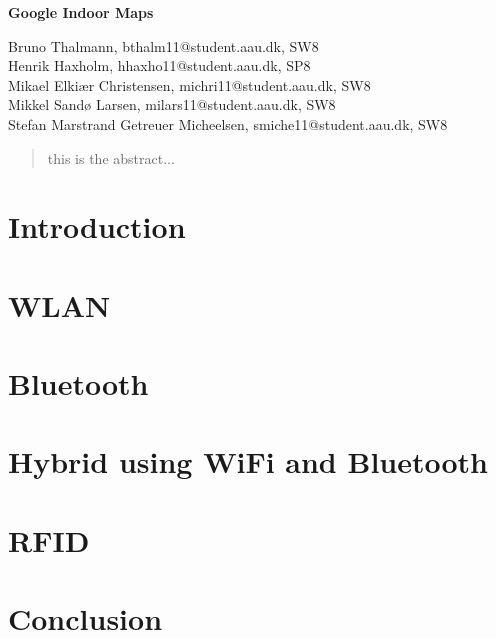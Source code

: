 \documentclass[12pt,a4paper]{article}
\begin{document}
\begin{center}
\bigskip\bigskip
{\Large\bf Google Indoor Maps}
\bigskip\bigskip


Bruno Thalmann, bthalm11@student.aau.dk, SW8\\
Henrik Haxholm, hhaxho11@student.aau.dk, SP8\\
Mikael Elkiær Christensen, michri11@student.aau.dk, SW8\\
Mikkel Sandø Larsen, milars11@student.aau.dk, SW8\\
Stefan Marstrand Getreuer Micheelsen, smiche11@student.aau.dk, SW8

\bigskip
\begin{abstract}
this is the abstract...
\end{abstract}

\thispagestyle{empty}
\end{center}


\titlepage



\thispagestyle{plain}


\section{Introduction}


\section{WLAN}


\section{Bluetooth}


\section{Hybrid using WiFi and Bluetooth}

\section{RFID}


\section{Conclusion}




\end{document}
